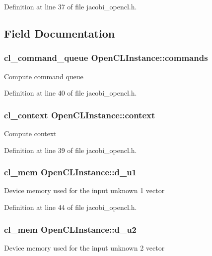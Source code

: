 Definition at line 37 of file jacobi\-\_\-opencl.\-h.



\subsection{Field Documentation}
\hypertarget{struct_open_c_l_instance_a0af493bf8b0fa33e91dd7e7675b4a2d8}{
\subsubsection[{commands}]{\setlength{\rightskip}{0pt plus 5cm}cl\-\_\-command\-\_\-queue Open\-C\-L\-Instance\-::commands}}\label{struct_open_c_l_instance_a0af493bf8b0fa33e91dd7e7675b4a2d8}
Compute command queue 

Definition at line 40 of file jacobi\-\_\-opencl.\-h.

\hypertarget{struct_open_c_l_instance_a44eab7fed94fa64d0a67fa3f992ce502}{
\subsubsection[{context}]{\setlength{\rightskip}{0pt plus 5cm}cl\-\_\-context Open\-C\-L\-Instance\-::context}}\label{struct_open_c_l_instance_a44eab7fed94fa64d0a67fa3f992ce502}
Compute context 

Definition at line 39 of file jacobi\-\_\-opencl.\-h.

\hypertarget{struct_open_c_l_instance_ae2de6de8249187081eab1b552ba1c1a0}{
\subsubsection[{d\-\_\-u1}]{\setlength{\rightskip}{0pt plus 5cm}cl\-\_\-mem Open\-C\-L\-Instance\-::d\-\_\-u1}}\label{struct_open_c_l_instance_ae2de6de8249187081eab1b552ba1c1a0}
Device memory used for the input unknown 1 vector 

Definition at line 44 of file jacobi\-\_\-opencl.\-h.

\hypertarget{struct_open_c_l_instance_a1625f6746ccb378443e0195e74c99f9a}{
\subsubsection[{d\-\_\-u2}]{\setlength{\rightskip}{0pt plus 5cm}cl\-\_\-mem Open\-C\-L\-Instance\-::d\-\_\-u2}}\label{struct_open_c_l_instance_a1625f6746ccb378443e0195e74c99f9a}
Device memory used for the input unknown 2 vector 

